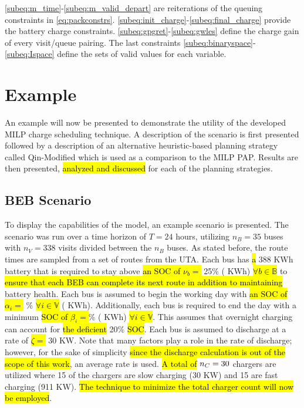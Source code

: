\documentclass[utf8]{FrontiersinHarvard}
\newcommand{\A}{35 }                                                            %
\newcommand{\N}{338 }                                                           %
\newcommand{\acharge}{0.9}                                                      %
\newcommand{\bcharge}{0.7 }                                                     %
\newcommand{\mincharge}{25\% }                                                  %
\newcommand{\minchargeD}{0.25 }                                                 %
\newcommand{\batsize}{388 }                                                     %
\newcommand{\fast}{15 }                                                         %
\newcommand{\slow}{15 }                                                         %
\newcommand{\fasts}{911 }                                                       %
\newcommand{\slows}{30 }                                                        %
\begin{document}
\autoref{subeq:m_time}-\autoref{subeq:m_valid_depart} are reiterations of the queuing constraints in
\autoref{eq:packconstrs}. \autoref{subeq:init_charge}-\autoref{subeq:final_charge} provide the battery charge
constraints. \autoref{subeq:gpgret}-\autoref{subeq:gwles} define the charge gain of every visit/queue
pairing. The last constraints \autoref{subeq:binaryspace}-\autoref{subeq:Ispace} define the sets of valid values for each
variable.
\section{Example}
\label{sec:example}
An example will now be presented to demonstrate the utility of the developed MILP charge scheduling technique. A
description of the scenario is first presented followed by a description of an alternative heuristic-based planning
strategy called Qin-Modified which is used as a comparison to the MILP PAP. Results are then presented,
\hl{analyzed and discussed} for each of the planning strategies.

\subsection{BEB Scenario}
\label{beb-scenario}
To display the capabilities of the model, an example scenario is presented. The scenario was run over a time horizon of
\(T=24\) hours, utilizing \(n_B = \A\) buses with \(n_V = \N\) visits divided between the \(n_B\) buses. As stated before, the
route times are sampled from a set of routes from the UTA. Each bus has \hl{a} \batsize KWh battery that is
required to stay above \hl{an SOC of $\nu_b =$} \mincharge (\fpeval{\batsize * \minchargeD} KWh)
\hl{$\forall b \in \mathbb{B}$} to \hl{ensure that each BEB can complete its next route in addition to maintaining} battery health. Each bus is assumed to begin the working day with \hl{an SOC of $\alpha_i = $}
\fpeval{\acharge*100}\% \hl{$\forall i \in \mathbb{V}$} (\fpeval{\acharge * \batsize} KWh). Additionally, each bus is
required to end the day with a minimum \hl{ SOC of $\beta_i = $}\fpeval{\bcharge * 100}\%
(\fpeval{\bcharge * \batsize} KWh) \hl{$\forall i \in \mathbb{V}$}. This assumes that overnight charging
can account for \hl{the deficient} 20\% \hl{SOC}. Each bus is assumed to discharge at a rate of
\hl{$\zeta = $} 30 KW. Note that many factors play a role in the rate of discharge; however, for the sake of
simplicity \hl{since the discharge calculation is out of the scope of this work}, an average rate is used.
\hl{A total of} \(n_C = \fpeval{\fast + \slow}\) chargers are utilized where \slow of the chargers are slow
charging (\slows KW) and \fast are fast charging (\fasts KW). \hl{The technique to minimize the total charger count will now be employed}.
\end{document}
